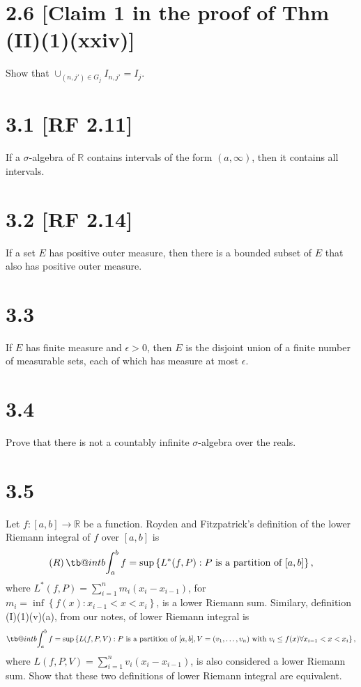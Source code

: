 \documentclass[12pt]{article}
\makeatletter
\newcommand\bint{\mathop{\mathpalette\tb@int{b}}\!\int}
\newcommand\tb@int[2]{%
  \sbox\z@{$\m@th#1\int$}%
  \if#2t%
    \rlap{\hbox to\wd\z@{%
      \hfil
      \vrule width .35em height \dimexpr\ht\z@+1.4pt\relax depth -\dimexpr\ht\z@+1pt\relax
      \kern.05em %
    }}
  \else
    \rlap{\hbox to\wd\z@{%
      \vrule width .35em height -\dimexpr\dp\z@+1pt\relax depth \dimexpr\dp\z@+1.4pt\relax
      \hfil
    }}
  \fi
}
\makeatother
\begin{document}
\section*{2.6 [Claim 1 in the proof of Thm (II)(1)(xxiv)]} 
Show that $\cup_{(n,j')\in G_{j}}I_{n,j'} = I_{j}$.



\section*{3.1 [RF 2.11]} 
If a $\sigma$-algebra of $\mathbb{R}$ contains intervals of the form $(a, \infty)$, then it contains all intervals.


\section*{3.2 [RF 2.14]} 
If a set $E$ has positive outer measure, then there is a bounded subset of $E$ that also has positive outer measure.


\section*{3.3} 
If $E$ has finite measure and $\epsilon > 0$, then $E$ is the disjoint union of a finite number of measurable sets, each of which has measure at most
$\epsilon$.


\section*{3.4} 
Prove that there is not a countably infinite $\sigma$-algebra over the reals.


\section*{3.5} 
Let $f: [a,b] \rightarrow \mathbb{R}$ be a function. Royden and Fitzpatrick's definition of the lower Riemann integral of $f$ over $[a,b]$ is 
\[ (R)\bint_{a}^{b} f = \sup\left\{ L^{*}(f,P) : P\text{ is a partition of }[a,b] \right\}, \]
where $L^{*}(f,P) = \sum_{i=1}^{n}m_{i}(x_{i} - x_{i-1})$, for $m_{i} = \inf\left\{ f(x) : x_{i-1} < x < x_{i} \right\}$, is a lower Riemann sum. Similary,
definition (I)(1)(v)(a), from our notes, of lower Riemann integral is 
\[ \bint_{a}^{b}f = \sup\left\{ L(f, P, V) : P\text{ is a partition of }[a,b], V = (v_{1}, \dots, v_{n})\text{ with }v_{i} \leq f(x)\forall x_{i-1} <
x < x_{i} \right\}, \]
where $L(f,P,V) = \sum_{i=1}^{n}v_{i}(x_{i} - x_{i-1})$, is also considered a lower Riemann sum. 
Show that these two definitions of lower Riemann integral are equivalent.
\end{document}
